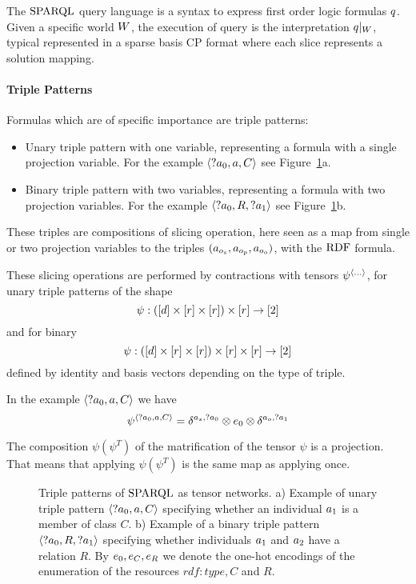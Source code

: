 The $\mathrm{SPARQL}$ query language is a syntax to express first order logic formulas $q$.
Given a specific world $W$, the execution of query is the interpretation ${q}|_{W}$, typical represented in a sparse basis CP format where each slice represents a solution mapping.

\paragraph{Triple Patterns}

Formulas which are of specific importance are triple patterns:
\begin{itemize}
	\item Unary triple pattern with one variable, representing a formula with a single projection variable.
	 	For the example $\braket{?a_{0},a,C}$ see Figure~\ref{fig:triplePatterns}a.
	\item Binary triple pattern with two variables, representing a formula with two projection variables.
		For the example  $\braket{?a_{0},R,?a_{1}}$ see Figure~\ref{fig:triplePatterns}b.
\end{itemize}

These triples are compositions of slicing operation, here seen as a map from single or two projection variables to the triples $(a_{o_{s}}, a_{o_{p}}, a_{o_{o}})$, with the $\mathrm{RDF}$ formula.


These slicing operations are performed by contractions with tensors $\psi^{\braket{...}}$, for unary triple patterns of the shape
	\[ \psi : \left( [d] \times [r] \times [r] \right) \times [r] \rightarrow [2] \]
and for binary
	\[ \psi : \left( [d] \times [r] \times [r] \right) \times [r] \times [r] \rightarrow [2] \]
defined by identity and basis vectors depending on the type of triple.

In the example $\braket{?a_{0},a,C}$ we have
	\[ \psi^{\braket{?a_{0},a,C}} = \delta^{a_{s},?a_{0}} \otimes e_{0} \otimes \delta^{a_{o},?a_{1}}   \]


%
The composition $\psi (\psi^T)$ of the matrification of the tensor $\psi$ is a projection.
That means that applying $\psi (\psi^T)$ is the same map as applying once.


\begin{figure}[h]
\begin{center}
		
\end{center}
\caption{Triple patterns of $\mathrm{SPARQL}$ as tensor networks.
	a) Example of unary triple pattern $\braket{?a_{0},a,C}$ specifying whether an individual $a_{1}$ is a member of class $C$.
	b) Example of a binary triple pattern $\braket{?a_{0},R,?a_{1}}$ specifying whether individuals $a_{1}$ and $a_{2}$ have a relation $R$.
		By $e_{0},e_{C},e_{R}$ we denote the one-hot encodings of the enumeration of the resources $rdf:type, C$ and $R$.}
\label{fig:triplePatterns}
\end{figure}




